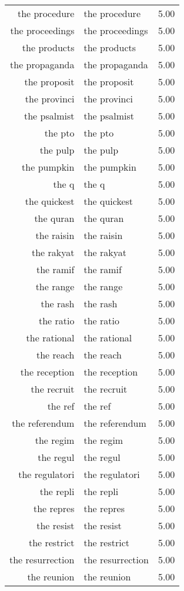 \begin{table}[ht]
\begin{tabular}{rlr}
  the procedure & the procedure & 5.00 \\ 
  the proceedings & the proceedings & 5.00 \\ 
  the products & the products & 5.00 \\ 
  the propaganda & the propaganda & 5.00 \\ 
  the proposit & the proposit & 5.00 \\ 
  the provinci & the provinci & 5.00 \\ 
  the psalmist & the psalmist & 5.00 \\ 
  the pto & the pto & 5.00 \\ 
  the pulp & the pulp & 5.00 \\ 
  the pumpkin & the pumpkin & 5.00 \\ 
  the q & the q & 5.00 \\ 
  the quickest & the quickest & 5.00 \\ 
  the quran & the quran & 5.00 \\ 
  the raisin & the raisin & 5.00 \\ 
  the rakyat & the rakyat & 5.00 \\ 
  the ramif & the ramif & 5.00 \\ 
  the range & the range & 5.00 \\ 
  the rash & the rash & 5.00 \\ 
  the ratio & the ratio & 5.00 \\ 
  the rational & the rational & 5.00 \\ 
  the reach & the reach & 5.00 \\ 
  the reception & the reception & 5.00 \\ 
  the recruit & the recruit & 5.00 \\ 
  the ref & the ref & 5.00 \\ 
  the referendum & the referendum & 5.00 \\ 
  the regim & the regim & 5.00 \\ 
  the regul & the regul & 5.00 \\ 
  the regulatori & the regulatori & 5.00 \\ 
  the repli & the repli & 5.00 \\ 
  the repres & the repres & 5.00 \\ 
  the resist & the resist & 5.00 \\ 
  the restrict & the restrict & 5.00 \\ 
  the resurrection & the resurrection & 5.00 \\ 
  the reunion & the reunion & 5.00 \\ 

\end{tabular}
\end{table}
